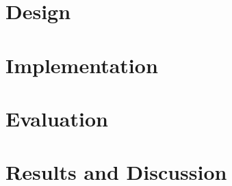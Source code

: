 
% 

% 

\section{Design}\label{sec:opal-design}


\section{Implementation}\label{sec:opal-impl}


\section{Evaluation}\label{sec:opal-evaluation}


\section{Results and Discussion}\label{sec:opal-results}


